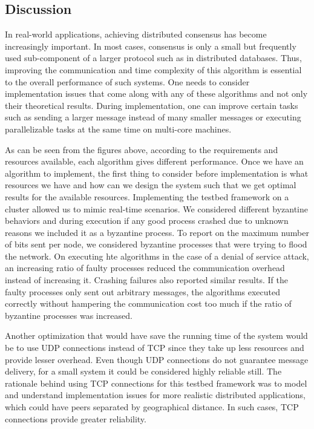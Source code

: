 \subsection{Discussion}

In real-world applications, achieving distributed consensus has become increasingly important. In most cases, consensus is only a small but frequently used sub-component of a larger protocol such as in distributed databases. Thus, improving the communication and time complexity of this algorithm is essential to the overall performance of such systems. One needs to consider implementation issues that come along with any of these algorithms and not only their theoretical results. During implementation, one can improve certain tasks such as sending a larger message instead of many smaller messages or executing parallelizable tasks at the same time on multi-core machines.  

As can be seen from the figures above, according to the requirements and resources available, each algorithm gives different performance. Once we have an algorithm to implement, the first thing to consider before implementation is what resources we have and how can we design the system such that we get optimal results for the available resources. Implementing the testbed framework on a cluster allowed us to mimic real-time scenarios. We considered different byzantine behaviors and during execution if any good process crashed due to unknown reasons we included it as a byzantine process. To report on the maximum number of bits sent per node, we considered byzantine processes that were trying to flood the network. On executing hte algorithms in the case of a denial of service attack, an increasing ratio of faulty processes reduced the communication overhead instead of increasing it. Crashing failures also reported similar results. If the faulty processes only sent out arbitrary messages, the algorithms executed correctly without hampering the communication cost too much if the ratio of byzantine processes was increased.

Another optimization that would have save the running time of the system would be to use UDP connections instead of TCP since they take up less resources and provide lesser overhead. Even though UDP connections do not guarantee message delivery, for a small system it could be considered highly reliable still. The rationale behind using TCP connections for this testbed framework was to model and understand implementation issues for more realistic distributed applications, which could have peers separated by geographical distance. In such cases, TCP connections provide greater reliability. 

